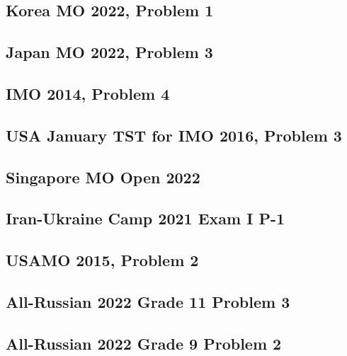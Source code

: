 \subsection{Korea MO 2022, Problem 1}


\subsection{Japan MO 2022, Problem 3}


\subsection{IMO 2014, Problem 4}


\subsection{USA January TST for IMO 2016, Problem 3}


\subsection{Singapore MO Open 2022}


\subsection{Iran-Ukraine Camp 2021 Exam I P-1}


\subsection{USAMO 2015, Problem 2}


\subsection{All-Russian 2022 Grade 11 Problem 3}


\subsection{All-Russian 2022 Grade 9 Problem 2}


